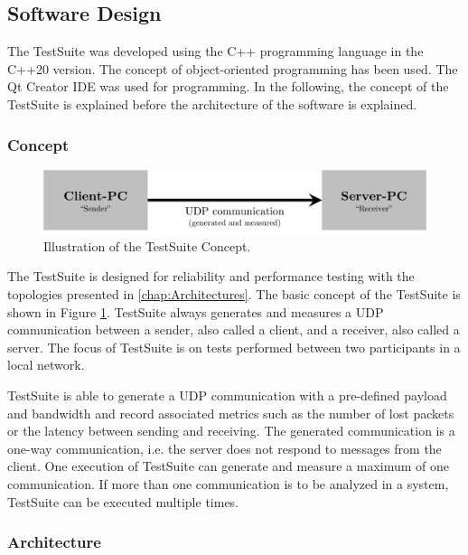 \subsection{Software Design}
The TestSuite was developed using the C++ programming language in the C++20 version. The concept of object-oriented programming has been used. The Qt Creator IDE was used for programming. In the following, the concept of the TestSuite is explained before the architecture of the software is explained.

\subsubsection{Concept}

\begin{figure}[h!]
    \centering
    \includegraphics[width=1\linewidth]{figures/method/swdesign1.pdf}
    \caption[Illustration of the TestSuite Concept]{Illustration of the TestSuite Concept.}
    \label{fig:tsconcept}
\end{figure}

The TestSuite is designed for reliability and performance testing with the topologies presented in \ref{chap:Architectures}. The basic concept of the TestSuite is shown in Figure \ref{fig:tsconcept}. TestSuite always generates and measures a UDP communication between a sender, also called a client, and a receiver, also called a server. The focus of TestSuite is on tests performed between two participants in a local network.

TestSuite is able to generate a UDP communication with a pre-defined payload and bandwidth and record associated metrics such as the number of lost packets or the latency between sending and receiving. The generated communication is a one-way communication, i.e. the server does not respond to messages from the client. One execution of TestSuite can generate and measure a maximum of one communication. If more than one communication is to be analyzed in a system, TestSuite can be executed multiple times.

\subsubsection{Architecture}

